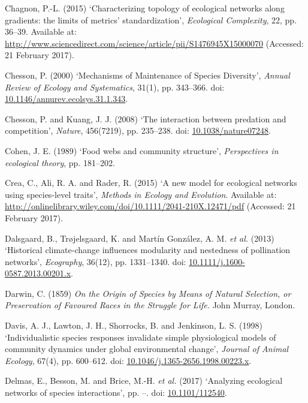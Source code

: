 \documentclass[12pt]{article}
\begin{document}
\hypertarget{ref-chag15cte}{}
Chagnon, P.-L. (2015) `Characterizing topology of ecological networks
along gradients: the limits of metrics' standardization',
\emph{Ecological Complexity}, 22, pp. 36--39. Available at:
\url{http://www.sciencedirect.com/science/article/pii/S1476945X15000070}
(Accessed: 21 February 2017).

\hypertarget{ref-ches00mms}{}
Chesson, P. (2000) `Mechanisms of Maintenance of Species Diversity',
\emph{Annual Review of Ecology and Systematics}, 31(1), pp. 343--366.
doi:
\href{https://doi.org/10.1146/annurev.ecolsys.31.1.343}{10.1146/annurev.ecolsys.31.1.343}.

\hypertarget{ref-ches08ipc}{}
Chesson, P. and Kuang, J. J. (2008) `The interaction between predation
and competition', \emph{Nature}, 456(7219), pp. 235--238. doi:
\href{https://doi.org/10.1038/nature07248}{10.1038/nature07248}.

\hypertarget{ref-cohe89fwc}{}
Cohen, J. E. (1989) `Food webs and community structure',
\emph{Perspectives in ecological theory}, pp. 181--202.

\hypertarget{ref-crea15nme}{}
Crea, C., Ali, R. A. and Rader, R. (2015) `A new model for ecological
networks using species-level traits', \emph{Methods in Ecology and
Evolution}. Available at:
\url{http://onlinelibrary.wiley.com/doi/10.1111/2041-210X.12471/pdf}
(Accessed: 21 February 2017).

\hypertarget{ref-dals13hci}{}
Dalsgaard, B., Trøjelsgaard, K. and Martín González, A. M. \emph{et al.}
(2013) `Historical climate-change influences modularity and nestedness
of pollination networks', \emph{Ecography}, 36(12), pp. 1331--1340. doi:
\href{https://doi.org/10.1111/j.1600-0587.2013.00201.x}{10.1111/j.1600-0587.2013.00201.x}.

\hypertarget{ref-darw59osm}{}
Darwin, C. (1859) \emph{On the Origin of Species by Means of Natural
Selection, or Preservation of Favoured Races in the Struggle for Life.}
John Murray, London.

\hypertarget{ref-davi98isr}{}
Davis, A. J., Lawton, J. H., Shorrocks, B. and Jenkinson, L. S. (1998)
`Individualistic species responses invalidate simple physiological
models of community dynamics under global environmental change',
\emph{Journal of Animal Ecology}, 67(4), pp. 600--612. doi:
\href{https://doi.org/10.1046/j.1365-2656.1998.00223.x}{10.1046/j.1365-2656.1998.00223.x}.

\hypertarget{ref-delm17aen}{}
Delmas, E., Besson, M. and Brice, M.-H. \emph{et al.} (2017) `Analyzing
ecological networks of species interactions', pp. --. doi:
\href{https://doi.org/10.1101/112540}{10.1101/112540}.
\end{document}
